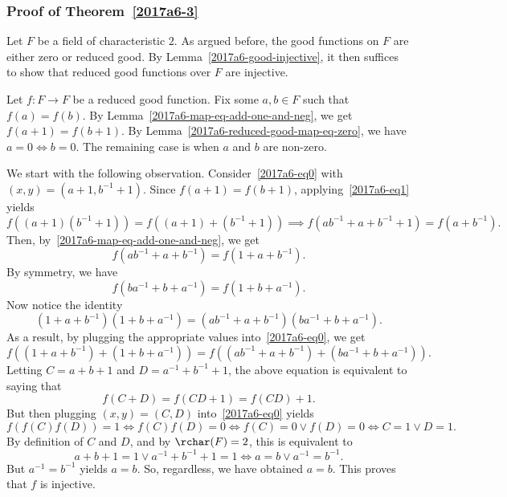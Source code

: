 \subsubsection*{Proof of Theorem~\ref{2017a6-3}}

Let $F$ be a field of characteristic $2$.
As argued before, the good functions on $F$ are either zero or reduced good.
By Lemma~\ref{2017a6-good-injective}, it then suffices to show that reduced good functions over $F$ are injective.

Let $f : F \to F$ be a reduced good function.
Fix some $a, b \in F$ such that $f(a) = f(b)$.
By Lemma~\ref{2017a6-map-eq-add-one-and-neg}, we get $f(a + 1) = f(b + 1)$.
By Lemma~\ref{2017a6-reduced-good-map-eq-zero}, we have $a = 0 \iff b = 0$.
The remaining case is when $a$ and $b$ are non-zero.

We start with the following observation.
Consider~\eqref{2017a6-eq0} with $(x, y) = (a + 1, b^{-1} + 1)$.
Since $f(a + 1) = f(b + 1)$, applying~\eqref{2017a6-eq1} yields
\[ f((a + 1)(b^{-1} + 1)) = f((a + 1) + (b^{-1} + 1)) \implies f(ab^{-1} + a + b^{-1} + 1) = f(a + b^{-1}). \]
Then, by~\eqref{2017a6-map-eq-add-one-and-neg}, we get
\[ f(ab^{-1} + a + b^{-1}) = f(1 + a + b^{-1}). \]
By symmetry, we have
\[ f(ba^{-1} + b + a^{-1}) = f(1 + b + a^{-1}). \]
Now notice the identity
\[ (1 + a + b^{-1})(1 + b + a^{-1}) = (ab^{-1} + a + b^{-1})(ba^{-1} + b + a^{-1}). \]
As a result, by plugging the appropriate values into~\eqref{2017a6-eq0}, we get
\[ f((1 + a + b^{-1}) + (1 + b + a^{-1})) = f((ab^{-1} + a + b^{-1}) + (ba^{-1} + b + a^{-1})). \]
Letting $C = a + b + 1$ and $D = a^{-1} + b^{-1} + 1$, the above equation is equivalent to saying that
\[ f(C + D) = f(CD + 1) = f(CD) + 1. \]
But then plugging $(x, y) = (C, D)$ into~\eqref{2017a6-eq0} yields
\[ f(f(C) f(D)) = 1 \iff f(C) f(D) = 0 \iff f(C) = 0 \vee f(D) = 0 \iff C = 1 \vee D = 1. \]
By definition of $C$ and $D$, and by $\rchar(F) = 2$, this is equivalent to
\[ a + b + 1 = 1 \vee a^{-1} + b^{-1} + 1 = 1 \iff a = b \vee a^{-1} = b^{-1}. \]
But $a^{-1} = b^{-1}$ yields $a = b$.
So, regardless, we have obtained $a = b$.
This proves that $f$ is injective.

